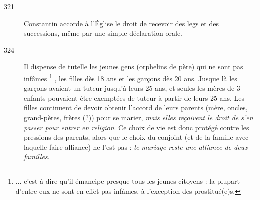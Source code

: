 \begin{description}
\item[321] Constantin accorde à l'Église le droit de recevoir des legs et des successions, même par une simple déclaration orale. 

\item[324] Il dispense de tutelle les jeunes gens  (orphelins de père) qui ne sont pas infâmes%
\footnote{... c'est-à-dire qu'il émancipe presque tous les jeunes citoyens : la plupart d'entre eux ne sont en effet pas infâmes, à l'exception des prostitué(e)s.}%
, les filles dès 18 ans et les garçons dès 20 ans. Jusque là les garçons  avaient un tuteur jusqu'à leurs 25 ans, et seules les mères  de 3 enfants pouvaient être exemptées de tuteur à partir de leurs 25 ans. Les filles continuent de devoir obtenir l'accord de leurs parents (mère, oncles, grand-pères, frères (?)) pour se marier, \emph{mais elles reçoivent le droit de s'en passer pour entrer en religion}. Ce choix de vie est donc protégé contre les pressions des parents, alors que le choix du conjoint (et de la famille avec laquelle faire alliance) ne l'est pas : \emph{le mariage reste une alliance de deux familles}.


\end{description}
